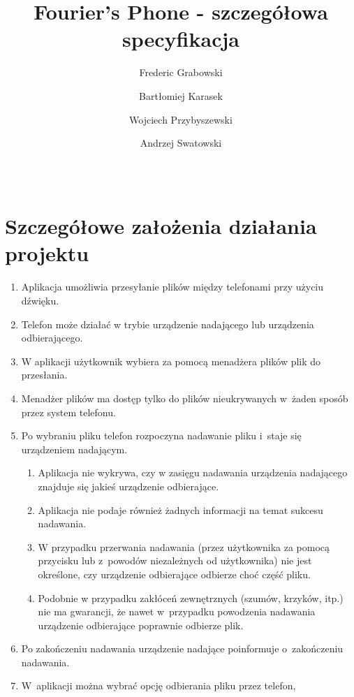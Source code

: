 \documentclass{article}
\title{Fourier's Phone - szczegółowa specyfikacja}
\author{Frederic Grabowski \and Bartłomiej Karasek \and Wojciech Przybyszewski 
        \and Andrzej Swatowski}
\date{\documentdate \\ \documentversion}
\begin{document}
\maketitle
\newpage

\tableofcontents
\newpage

\section{Szczegółowe założenia działania projektu}
    \begin{enumerate}
        \item Aplikacja umożliwia przesyłanie plików między telefonami przy 
              użyciu dźwięku.
        \item Telefon może działać w trybie urządzenie nadającego lub urządzenia
              odbierającego.
        \item W aplikacji użytkownik wybiera za pomocą menadżera plików plik do
              przesłania.
        \item Menadżer plików ma dostęp tylko do plików nieukrywanych w~żaden 
              sposób przez system telefonu.
        \item Po wybraniu pliku telefon rozpoczyna nadawanie pliku i~staje się 
              urządzeniem nadającym.
            \begin{enumerate}
                \item Aplikacja nie wykrywa, czy w zasięgu nadawania urządzenia
                      nadającego znajduje się jakieś urządzenie odbierające.
                \item Aplikacja nie podaje również żadnych informacji na temat
                      sukcesu nadawania.
                \item W przypadku przerwania nadawania (przez użytkownika za 
                      pomocą przycisku lub z~powodów niezależnych od użytkownika) 
                      nie jest określone, czy urządzenie odbierające odbierze 
                      choć część pliku.
                \item Podobnie w przypadku zakłóceń zewnętrznych (szumów, krzyków,
                      itp.) nie ma gwarancji, że nawet w~przypadku powodzenia 
                      nadawania urządzenie odbierające poprawnie odbierze plik.
            \end{enumerate}
        \item Po zakończeniu nadawania urządzenie nadające poinformuje 
              o~zakończeniu nadawania.
        \item W~aplikacji można wybrać opcję odbierania pliku przez telefon, 

\end{enumerate}
\end{document}
